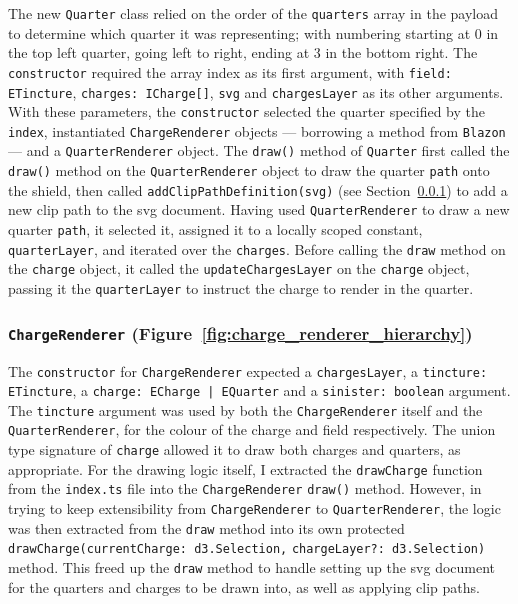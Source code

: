 \documentclass[nobib, a4paper, twoside, justified]{tufte-book}
\makeatletter
\newcommand{\svg}{\gls{svg}\@\xspace}
\newcommand{\charge}{\gls{charge}\@\xspace}
\newcommand{\charges}{\glspl{charge}\@\xspace}
\newcommand{\quarter}{\gls{quarter}\@\xspace}
\newcommand{\quarters}{\glspl{quarter}\@\xspace}
\makeatother
\begin{document}
The new \texttt{Quarter} class relied on the order of the \texttt{quarters} array in the payload to
determine which quarter it was representing; with numbering starting at 0 in the top left quarter,
going left to right, ending at 3 in the bottom right. The \texttt{constructor} required the array
index as its first argument, with \texttt{field: ETincture}, \texttt{charges: ICharge[]},
\texttt{svg} and \texttt{chargesLayer} as its other arguments. With these parameters, the
\texttt{constructor} selected the quarter specified by the \texttt{index}, instantiated
\texttt{ChargeRenderer} objects --- borrowing a method from \texttt{Blazon} --- and a
\texttt{QuarterRenderer} object. The \texttt{draw()} method of \texttt{Quarter} first called the
\texttt{draw()} method on the \texttt{QuarterRenderer} object to draw the quarter \texttt{path}
onto the shield, then called \texttt{addClipPathDefinition(svg)} (see
Section~\ref{ssub:charge_renderer}) to add a new clip path to the \svg document. Having used
\texttt{QuarterRenderer} to draw a new quarter \texttt{path}, it selected it, assigned it to a
locally scoped constant, \texttt{quarterLayer}, and iterated over the \texttt{charges}. Before
calling the \texttt{draw} method on the \texttt{charge} object, it called the
\texttt{updateChargesLayer} on the \texttt{charge} object, passing it the \texttt{quarterLayer} to
instruct the \charge to render in the \quarter.

\subsubsection{\texttt{ChargeRenderer} (Figure~\ref{fig:charge_renderer_hierarchy})}%
\label{ssub:charge_renderer}

The \texttt{constructor} for \texttt{ChargeRenderer} expected a \texttt{chargesLayer}, a
\texttt{tincture: ETincture}, a \texttt{charge: ECharge | EQuarter} and a \texttt{sinister:
boolean} argument. The \texttt{tincture} argument was used by both the \texttt{ChargeRenderer}
itself and the \texttt{QuarterRenderer}, for the colour of the \charge and \gls{field}
respectively. The union type signature of \texttt{charge} allowed it to draw both \charges and
\quarters, as appropriate. For the drawing logic itself, I extracted the \texttt{drawCharge}
function from the \texttt{index.ts} file into the \texttt{ChargeRenderer} \texttt{draw()} method.
However, in trying to keep extensibility from \texttt{ChargeRenderer} to \texttt{QuarterRenderer},
the logic was then extracted from the \texttt{draw} method into its own protected
\texttt{drawCharge(}\texttt{currentCharge: d3.Selection,} \texttt{chargeLayer?: d3.Selection)}
method. This freed up the \texttt{draw} method to handle setting up the \svg document for the
\quarters and \charges to be drawn into, as well as applying clip paths.
\end{document}
